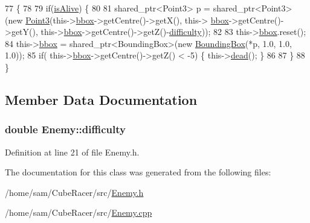 \begin{DoxyCode}
77                    \{
78 
79   \textcolor{keywordflow}{if}(\hyperlink{classGameAsset_aebf93ae52dc7fabbb6ec7edaadf915d0}{isAlive}) \{
80 
81     shared\_ptr<Point3> p = shared\_ptr<Point3>(\textcolor{keyword}{new} \hyperlink{classVectormath_1_1Aos_1_1Point3}{Point3}(this->\hyperlink{classGameAsset_a3444a096fed505b1740bedc95e2cfa6c}{bbox}->getCentre()->getX(), this->
      \hyperlink{classGameAsset_a3444a096fed505b1740bedc95e2cfa6c}{bbox}->getCentre()->getY(), this->\hyperlink{classGameAsset_a3444a096fed505b1740bedc95e2cfa6c}{bbox}->getCentre()->getZ()-\hyperlink{classEnemy_acca04a63f878d07a3db3285f5f8fbbed}{difficulty}));
82 
83     this->\hyperlink{classGameAsset_a3444a096fed505b1740bedc95e2cfa6c}{bbox}.reset();
84     this->\hyperlink{classGameAsset_a3444a096fed505b1740bedc95e2cfa6c}{bbox} = shared\_ptr<BoundingBox>(\textcolor{keyword}{new} \hyperlink{classBoundingBox}{BoundingBox}(*p, 1.0, 1.0, 1.0));
85     \textcolor{keywordflow}{if}( this->\hyperlink{classGameAsset_a3444a096fed505b1740bedc95e2cfa6c}{bbox}->getCentre()->getZ() < -5) \{ this->\hyperlink{classGameAsset_a631982e6d36061c08c7e8981ce0fd308}{dead}(); \}
86 
87   \}
88 \}
\end{DoxyCode}


\subsection{Member Data Documentation}
\hypertarget{classEnemy_acca04a63f878d07a3db3285f5f8fbbed}{
\subsubsection[{difficulty}]{\setlength{\rightskip}{0pt plus 5cm}double Enemy\-::difficulty}}\label{classEnemy_acca04a63f878d07a3db3285f5f8fbbed}


Definition at line 21 of file Enemy.\-h.



The documentation for this class was generated from the following files\-:\begin{DoxyCompactItemize}
\item 
/home/sam/\-Cube\-Racer/src/\hyperlink{Enemy_8h}{Enemy.\-h}\item 
/home/sam/\-Cube\-Racer/src/\hyperlink{Enemy_8cpp}{Enemy.\-cpp}\end{DoxyCompactItemize}
